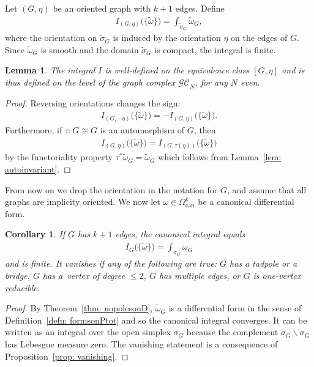 \documentclass[pdftex]{sigma}%
\newtheorem{cor}[thm]{Corollary}
\newtheorem{lem}[thm]{Lemma}
\numberwithin{equation}{section}
\newcommand{\GC}{\mathcal{GC}}
\newcommand{\can}{\mathrm{can}}
\newcommand{\0}{\color{blue}{\mathsf{0}}}
\begin{document}
\begin{defn}
Let $(G,\eta)$ be an oriented graph with $k+1$ edges. Define
\begin{gather*}
I_{(G,\eta)}\big(\{\widetilde{\omega}\}\big) = \int_{\widetilde{\sigma}_G} \widetilde{\omega}_G ,
\end{gather*}
where the orientation on $\widetilde{\sigma}_G$ is induced by the orientation $\eta$ on the edges of $G$.
Since $\widetilde{\omega}_G$ is smooth and the domain $\widetilde{\sigma}_G$ is compact, the integral is finite.
\end{defn}

\begin{lem} The integral $I$ is well-defined on the equivalence class $[G,\eta]$ and is thus defined on the level of the graph complex $\GC_N$, for any $N$ even.
\end{lem}
\begin{proof} Reversing orientations changes the sign:
\begin{gather*}
I_{(G,-\eta)} \big(\{\widetilde{\omega}\}\big) = - I_{(G,\eta)} \big(\{\widetilde{\omega}\}\big).
\end{gather*}
Furthermore, if $\tau\colon G \cong G$ is an automorphism of $G$, then
\begin{gather*}
I_{(G,\eta)} \big(\{\widetilde{\omega}\}\big) = I_{(G,\tau(\eta))} \big(\{\widetilde{\omega}\}\big)
\end{gather*}
by the functoriality property $\tau^* \widetilde{\omega}_G = \widetilde{\omega}_G$ which follows from Lemma~\ref{lem: autoinvariant}.
\end{proof}

 From now on we drop the orientation in the notation for $G$, and assume that all graphs are implicity oriented.
 We now let $\omega \in \Omega^k_{\can}$ be a canonical differential form.

\begin{cor}If $G$ has $k+1$ edges, the canonical integral equals
\begin{gather} \label{canintegralfinite} I_G\big(\{\widetilde{\omega}\}\big) = \int_{\sigma_G} \omega_G
\end{gather}
and is finite. It vanishes if any of the following are true: $G$ has a tadpole or a bridge, $G$ has a~vertex of degree $\leq 2$, $G$ has multiple edges, or $G$ is one-vertex reducible.
\end{cor}
\begin{proof} By Theorem~\ref{thm: nopolesonD}, $\widetilde{\omega}_G$ is a differential form in the sense of Definition~\ref{defn: formsonPtot} and so the
 canonical integral converges. It can be written as an integral over the open simplex $\sigma_G$ because the complement $\widetilde{\sigma}_G\backslash \sigma_G$ has Lebesgue measure zero. The vanishing statement is a consequence of Proposition~\ref{prop: vanishing}.
\end{proof}
\end{document}
